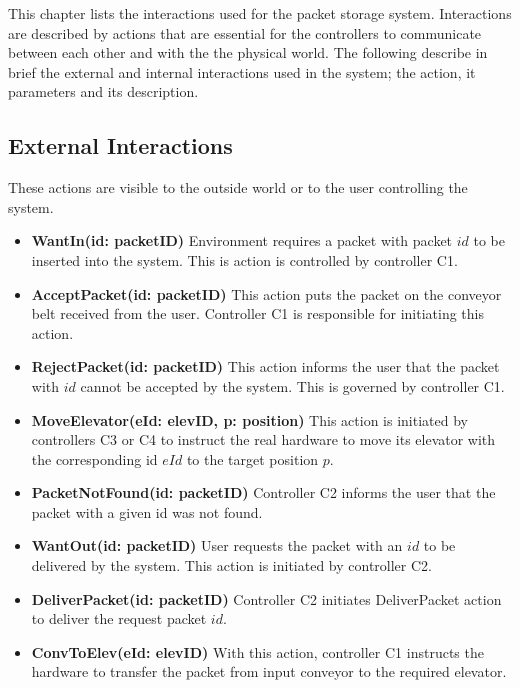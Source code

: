 \label{sec:ext_interactions}
This chapter lists the interactions used for the packet storage system. Interactions are described by actions that are essential for the controllers to communicate between each other and with the the physical world. The following describe in brief the external and internal interactions used in the system; the action, it parameters and its description.

\subsection*{External Interactions} These actions are visible to the outside world or to the user controlling the system.

\begin{itemize}
\item \textbf{WantIn(id: packetID)}
Environment requires a packet with packet $id$ to be inserted into the system. This is action is controlled by controller C1.

\item \textbf{AcceptPacket(id: packetID)}
This action puts the packet on the conveyor belt received from the user. Controller C1 is responsible for initiating this action.

\item \textbf{RejectPacket(id: packetID)}
This action informs the user that the packet with $id$ cannot be accepted by the system. This is governed by controller C1.

\item \textbf{MoveElevator(eId: elevID, p: position)}
This action is initiated by controllers C3 or C4 to instruct the real hardware to move its elevator with the corresponding id $eId$ to the target position $p$.

\item \textbf{PacketNotFound(id: packetID)}
Controller C2 informs the user that the packet with a given id was not found.

\item \textbf{WantOut(id: packetID)}
User requests the packet with an $id$ to be delivered by the system. This action is initiated by controller C2.

\item \textbf{DeliverPacket(id: packetID)}
Controller C2 initiates DeliverPacket action to deliver the request packet $id$.

\item \textbf{ConvToElev(eId: elevID)}
With this action, controller C1 instructs the hardware to transfer the packet from input conveyor to the required elevator.


\end{itemize}
